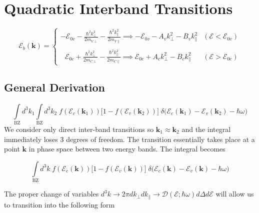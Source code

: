 \newpage
\section{Quadratic Interband Transitions}
\label{app:quadratic_interband_transitions}

\begin{equation}
\mathcal{E}_{b}(\mathbf{k})  = \begin{cases}
-\mathcal{E}_{0v} - \frac{{\hbar ^{2}k_{\perp}^{2}}}{2m_{V \perp}} - \frac{{\hbar ^{2}k_{\parallel}^{2}}}{2m_{V \parallel}} \implies-\mathcal{E}_{0 v}-A_{v}k_{\perp}^{2}-B_{v}k_{\parallel}^{2}  &(\mathcal{E}<\mathcal{E}_{0v})\\ \\ 
\ \ \ \mathcal{E}_{0 c} + \frac{{\hbar ^{2}k_{\perp}^{2}}}{2m_{C \perp}} - \frac{{\hbar ^{2}k_{\parallel}^{2}}}{2m_{C \parallel}} \implies\mathcal{E}_{0 c}+A_{c}k_{\perp}^{2}-B_{c}k_{\parallel}^{2} &(\mathcal{E}>\mathcal{E}_{0c})
\end{cases} 
\label{eq:quadratic_interband_bands}
\end{equation}

\newpage
\subsection{General Derivation}

\begin{equation}
\int\limits_{\text{BZ}} d^{3}k_{1} \int\limits_{\text{BZ}} d^{3}k_{2} \; f(\mathcal{E}_{c}(\mathbf{k}_{1})) \Big[1-f(\mathcal{E}_{v}(\mathbf{k}_{2}))\Big] \; \delta\Big(\mathcal{E}_{c}(\mathbf{k}_{1}) - \mathcal{E}_{v}(\mathbf{k}_{2}) - \hbar\omega  \Big)
\label{eq:quadratic_interband_double_integral}
\end{equation}
We consider only direct inter-band transitions so $\mathbf{k}_{1}\approx\mathbf{k}_{2}$ and the integral immediately loses 3 degrees of freedom. The transition essentially takes place at a point $\mathbf{k}$ in phase space between two energy bands. The integral becomes

\begin{equation}
\int\limits_{\text{BZ}} d^{3}k \; f(\mathcal{E}_{c}(\mathbf{k})) \Big[1-f(\mathcal{E}_{v}(\mathbf{k}))\Big] \; \delta\Big(\mathcal{E}_{c}(\mathbf{k}) - \mathcal{E}_{v}(\mathbf{k}) - \hbar\omega  \Big)
\label{eq:quadratic_interband_single_integral}
\end{equation}

The proper change of variables
$d^{3}k  \to 2\pi dk_{\perp}dk_{\parallel} \to  \mathcal{D}(\mathcal{E;\hbar\omega})d\Delta d\mathcal{E}$ will allow us to transition into the following form

